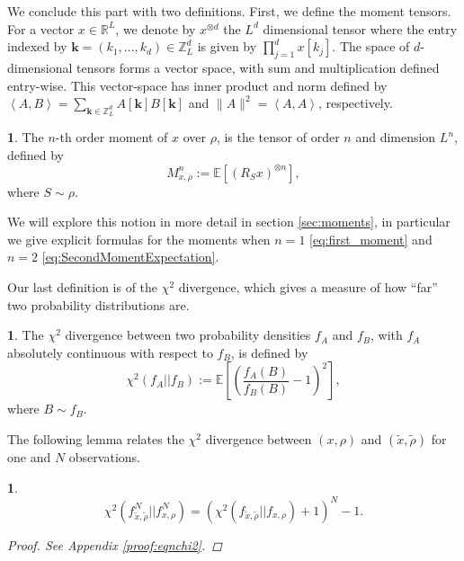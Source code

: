 \documentclass{IEEEtran}
\numberwithin{equation}{section}
\numberwithin{figure}{section}
\theoremstyle{plain}
\theoremstyle{definition}
\newtheorem{defn}[thm]{\protect\definitionname}
\theoremstyle{remark}
\theoremstyle{plain}
\newtheorem{lem}[thm]{\protect\lemmaname}
\theoremstyle{remark}
\theoremstyle{plain}
\theoremstyle{plain}
\theoremstyle{remark}
\providecommand{\definitionname}{Definition}
\providecommand{\lemmaname}{Lemma}
\newcommand{\RL}{\mathbb{R}^L}
\newcommand{\E}{\mathbb{E}}
\newcommand{\Z}{{\mathbb{Z}}}
\newcommand{\kk}{{\mathbf{k}}}
\begin{document}
We conclude this part with two definitions. First, we define the moment tensors. For a vector $x\in \RL$, we denote by $x^{\otimes d}$ the $L^{d}$ dimensional tensor where the entry indexed by $\kk=(k_1,\dots,k_d)\in \Z^d_L$ is given by $\prod_{j=1}^d x[k_j]$. The space of $d$-dimensional tensors forms a vector space, with sum and multiplication defined entry-wise. This vector-space has inner product and norm defined by $\left<A,B\right>=\sum_{\kk\in\Z_L^d}A[\kk]B[\kk]$ and $\|A\|^2=\left<A,A\right>$, respectively.
\begin{defn}\label{defn:autocorr}
	The $n$-th order moment of $x$ over $\rho$, is the tensor of order $n$ and dimension $L^{n}$, defined by
	\begin{equation*}\label{eq:autocorrelation}
	M^n_{x,\rho}:=\E\left[(R_S x)^{\otimes n}\right],
	\end{equation*}
	where $S\sim \rho$. 
\end{defn}

We will explore this notion in more detail in section \ref{sec:moments}, in particular we give explicit formulas for the moments when $n=1$ \eqref{eq:first_moment} and $n=2$ \eqref{eq:SecondMomentExpectation}.


Our last definition is of the $\chi^2$ divergence, which gives a measure of how ``far'' two probability distributions are.
\begin{defn}
	The $\chi^2$ divergence between two probability densities $f_A$ and $f_B$, with $f_A$ absolutely continuous with respect to $f_B$, is defined by
	\begin{equation*}
	\chi^2(f_A||f_B):=
	\E\left[\left(\frac{f_A(B)}{f_B(B)}-1\right)^2\right],
	\end{equation*}
	where $B\sim f_B$.
\end{defn}
The following lemma relates the $\chi^2$ divergence between $(x,\rho)$ and $(\tilde x,\tilde \rho)$ for one and $N$ observations.

\begin{lem}\label{lem:nchi2}
\begin{equation}\label{eq:nchi2}
\chi^2(f^N_{\tilde x,\tilde \rho}||f^N_{x,\rho})=(\chi^2(f_{\tilde x,\tilde \rho}||f_{x,\rho})+1)^N-1. 
\end{equation}
\begin{proof}
	See Appendix \ref{proof:eqnchi2}.
\end{proof}
\end{lem}
\end{document}
